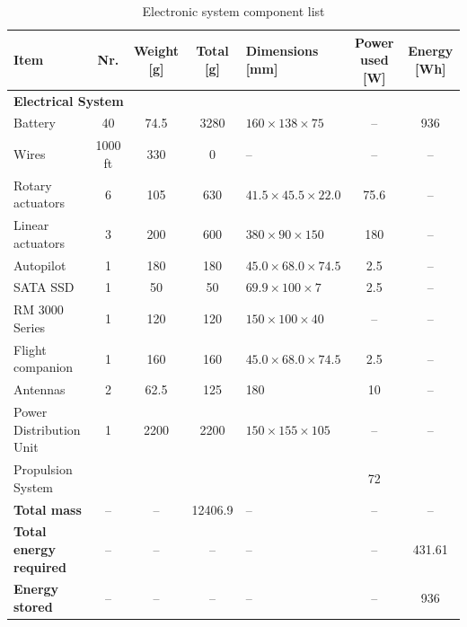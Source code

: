 \begin{table}[H]
\centering
\caption{Electronic system component list}
\label{tab:electric_comp}
\begin{tabular}{|p{}|c|c|c|p{}|c|c|}
\hline
\textbf{Item} &
\textbf{Nr.} &
\textbf{Weight [g]} &
\textbf{Total [g]} &
\textbf{Dimensions [mm]} &
\textbf{Power used [W]} &
\textbf{Energy [Wh]}\\
\hline
\hline

\multicolumn{7}{|l|}{\textbf{Electrical System}} \\
\hline
Battery & 40 & 74.5 & 3280 & $160 \times 138 \times 75$ & -- & 936 \\
\hline
Wires & 1000 ft & 330 & 0 & -- & -- & --\\
\hline
Rotary actuators & 6 & 105 & 630 & $41.5 \times 45.5 \times 22.0$ & 75.6 & --  \\
\hline
Linear actuators & 3 & 200 & 600 & $380 \times 90 \times 150$ & 180 & --  \\
\hline
Autopilot & 1 & 180 & 180 & $45.0 \times 68.0 \times 74.5$ & 2.5 & --  \\
\hline
SATA SSD & 1 & 50 & 50 & $69.9 \times 100 \times 7$ & 2.5 & -- \\
\hline
RM 3000 Series & 1 & 120 & 120 & $150 \times 100 \times 40$ & -- & -- \\
\hline
Flight companion & 1 & 160 & 160 & $45.0 \times 68.0 \times 74.5$ & 2.5 & --  \\
\hline
Antennas & 2 & 62.5 & 125 & 180 & 10 & -- \\
\hline
Power Distribution Unit & 1 & 2200 & 2200 & $150 \times 155 \times 105$ & -- & -- \\
\hline

Propulsion System & & & & &72& \\
\hline

\textbf{Total mass} & -- & -- & 12406.9 & -- & -- & -- \\
\hline
\textbf{Total energy required} & -- & -- & -- & -- & -- & 431.61 \\
\hline
\textbf{{Energy} stored} & -- & -- & -- & -- & -- & 936\\
\hline

\end{tabular}
\end{table}


